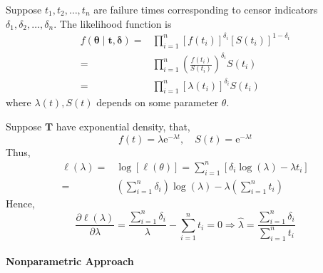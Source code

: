 Suppose $t_{1},t_{2},\ldots,t_{n}$ are failure times corresponding to censor indicators $\delta_{1},\delta_{2},\ldots,\delta_{n}$. The likelihood function is
\begin{equation}
	\begin{aligned}
		f\left(\boldsymbol{\theta}\mid\mathbf{t},\boldsymbol{\delta}\right)= & \prod_{i=1}^{n}\left[f\left(t_{i}\right)\right]^{\delta_{i}}\left[S\left(t_{i}\right)\right]^{1-\delta_{i}} \\
		=                                                                    & \prod_{i=1}^{n}\left(\frac{f\left(t_{i}\right)}{S\left(t_{i}\right)}\right)^{\delta_{i}}S\left(t_{i}\right) \\
		=                                                                    & \prod_{i=1}^{n}\left[\lambda\left(t_{i}\right)\right]^{\delta_{i}}S\left(t_{i}\right)
	\end{aligned}
\end{equation}
where $\lambda(t),S(t)$ depends on some parameter $\theta$.

\begin{example}
	Suppose $\boldsymbol{T}$ have exponential density, that,
	\begin{equation*}
		f(t)=\lambda \mathrm{e}^{-\lambda t},\quad S(t)=\mathrm{e}^{-\lambda t}
	\end{equation*}
	Thus,
	\begin{equation*}
		\begin{aligned}
			\ell(\lambda)= & \log[\ell(\theta)]=\sum_{i=1}^{n}\left[\delta_{i}\log(\lambda)-\lambda t_{i}\right]        \\
			=              & \left(\sum_{i=1}^{n}\delta_{i}\right)\log(\lambda)-\lambda\left(\sum_{i=1}^{n}t_{i}\right)
		\end{aligned}
	\end{equation*}
	Hence,
	\begin{equation*}
		\frac{\partial\ell(\lambda)}{\partial\lambda}=\frac{\sum_{i=1}^{n}\delta_{i}}{\lambda}-\sum_{i=1}^{n}t_{i}=0\Rightarrow\hat{\lambda}=\frac{\sum_{i=1}^{n}\delta_{i}}{\sum_{i=1}^{n}t_{i}}
	\end{equation*}
\end{example}

\paragraph*{Nonparametric Approach}

